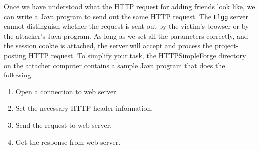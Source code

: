 Once we have understood what the HTTP request for adding friends look like, 
we can write a Java program to send out the 
same HTTP request. The {\tt Elgg} server cannot distinguish whether 
the request is sent out by the victim's browser or by the attacker's
Java program. As long as we set all the parameters correctly,
and the session cookie is attached, the server will accept and process the 
project-posting HTTP request.
To simplify your task, the HTTPSimpleForge directory on the attacher computer
contains a sample Java program that does the 
following:

\begin{enumerate}
\item Open a connection to web server.
\item Set the necessary HTTP header information.
\item Send the request to web server.
\item Get the response from web server. 
\end{enumerate}

